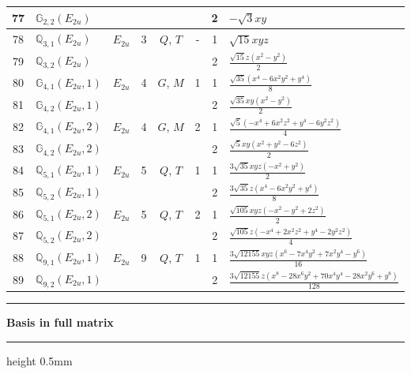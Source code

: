 \documentclass[fleqn,10pt,landscape]{jsarticle}
\begin{document}
\begin{longtable}[l]{clcccccl}
77 & $\mathbb{G}_{2,2}(E_{2u})$ &  &  &  &  & 2 & $- \sqrt{3} x y$ \\ \hline
78 & $\mathbb{Q}_{3,1}(E_{2u})$ & $E_{2u}$ & 3 & $Q$, $T$ & - & 1 & $\sqrt{15} x y z$ \\
79 & $\mathbb{Q}_{3,2}(E_{2u})$ &  &  &  &  & 2 & $\frac{\sqrt{15} z \left(x^{2} - y^{2}\right)}{2}$ \\ \hline
80 & $\mathbb{G}_{4,1}(E_{2u},1)$ & $E_{2u}$ & 4 & $G$, $M$ & 1 & 1 & $\frac{\sqrt{35} \left(x^{4} - 6 x^{2} y^{2} + y^{4}\right)}{8}$ \\
81 & $\mathbb{G}_{4,2}(E_{2u},1)$ &  &  &  &  & 2 & $\frac{\sqrt{35} x y \left(x^{2} - y^{2}\right)}{2}$ \\ \hline
82 & $\mathbb{G}_{4,1}(E_{2u},2)$ & $E_{2u}$ & 4 & $G$, $M$ & 2 & 1 & $\frac{\sqrt{5} \left(- x^{4} + 6 x^{2} z^{2} + y^{4} - 6 y^{2} z^{2}\right)}{4}$ \\
83 & $\mathbb{G}_{4,2}(E_{2u},2)$ &  &  &  &  & 2 & $\frac{\sqrt{5} x y \left(x^{2} + y^{2} - 6 z^{2}\right)}{2}$ \\ \hline
84 & $\mathbb{Q}_{5,1}(E_{2u},1)$ & $E_{2u}$ & 5 & $Q$, $T$ & 1 & 1 & $\frac{3 \sqrt{35} x y z \left(- x^{2} + y^{2}\right)}{2}$ \\
85 & $\mathbb{Q}_{5,2}(E_{2u},1)$ &  &  &  &  & 2 & $\frac{3 \sqrt{35} z \left(x^{4} - 6 x^{2} y^{2} + y^{4}\right)}{8}$ \\ \hline
86 & $\mathbb{Q}_{5,1}(E_{2u},2)$ & $E_{2u}$ & 5 & $Q$, $T$ & 2 & 1 & $\frac{\sqrt{105} x y z \left(- x^{2} - y^{2} + 2 z^{2}\right)}{2}$ \\
87 & $\mathbb{Q}_{5,2}(E_{2u},2)$ &  &  &  &  & 2 & $\frac{\sqrt{105} z \left(- x^{4} + 2 x^{2} z^{2} + y^{4} - 2 y^{2} z^{2}\right)}{4}$ \\ \hline
88 & $\mathbb{Q}_{9,1}(E_{2u},1)$ & $E_{2u}$ & 9 & $Q$, $T$ & 1 & 1 & $\frac{3 \sqrt{12155} x y z \left(x^{6} - 7 x^{4} y^{2} + 7 x^{2} y^{4} - y^{6}\right)}{16}$ \\
89 & $\mathbb{Q}_{9,2}(E_{2u},1)$ &  &  &  &  & 2 & $\frac{3 \sqrt{12155} z \left(x^{8} - 28 x^{6} y^{2} + 70 x^{4} y^{4} - 28 x^{2} y^{6} + y^{8}\right)}{128}$ \\
\end{longtable}
\vspace{5mm}
\noindent \rule[0.5mm]{5mm}{0.5mm}\hspace{3mm}\textbf{Basis in full matrix}\hspace{3mm}\leaders\hrule height 0.5mm\hfill\kern0pt
\vspace{3mm}
\end{document}
